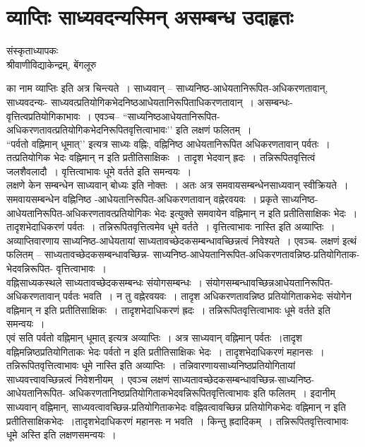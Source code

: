 {\fontsize{15}{17}\selectfont
\presetvalues
\chapter{व्याप्तिः साध्यवदन्यस्मिन्  असम्बन्ध उदाहृतः}

\begin{center}
\smallskip

संस्कृताध्यापकः\\
श्रीवाणीविद्याकेन्द्रम्, बेंगलूरु
\addrule
\end{center}

का नाम व्याप्तिः इति अत्र चिन्त्यते~। साध्यवान् – साध्यनिष्ठ-आधेयतानिरू\break पित-अधिकरणतावान्, साध्यवदन्यः- साध्यवत्प्रतियोगिकभेदनिष्ठ\enginline{-}आधेयतानिरूपि\break ताधिकरणतावान्~। असम्बन्धः-वृत्तित्वप्रतियोगिकाभावः~। एवञ्च– “साध्यनिष्ठ\enginline{-}आधेयता\break निरूपित-अधिकरणतावत्प्रतियोगिकभेदनिरूपितवृत्तित्वाभावः’’ इति लक्षणं फलितम्~। 
~\\[0.2cm]
“पर्वतो वह्निमान् धूमात्’’ इत्यत्र साध्यः वह्निः, वह्निनिष्ठ आधेयतानिरूपित अधिकरणतावान् पर्वतः~। तत्प्रतियोगिक भेदः वह्निमान् न इति प्रतीतिसाक्षिकः~। तादृश भेदवान् ह्रदः~। तन्निरूपितवृत्तित्वं जलशैवलादौ~। वृत्तित्वाभावः धूमे वर्तते इति समन्वयः~। 
~\\[0.2cm]
लक्षणे केन सम्बन्धेन साध्यवान् बोध्यः इति नोक्तः~। अतः अत्र समवायसम्बन्धेन\break साध्यवान् स्वीक्रियते~। समवायसम्बन्धेन वह्निनिष्ठ -आधेयता\-निरूपित-अधिकरणतावान् वह्नेरवयवः~। प्रकृते साध्यनिष्ठ-आधेयतानिरूपित-अधिकरणतावत्प्रतियोगिकः भेदः इत्युक्ते \hbox{समवायेन} वह्निमान् न इति प्रतीतिसाक्षिकः भेदः~। तादृशभेदाधिकरणं पर्वतः~। तन्निरूपितवृत्तित्वमेव धूमे वर्तते~। वृत्तित्वाभावः नास्ति इति अव्याप्तिः~। अव्याप्तिवारणाय साध्यनिष्ठ-आधेयतायां साध्यतावच्छेदकसम्बन्धावच्छिन्नत्वं निवेश्यते~। एवञ्च- लक्षणं इत्थं फलितम् – साध्यतावच्छेदकसम्बन्धावच्छिन्न- साध्यनिष्ठ-आधेयतानिरूपित-अधिकरणतावन्निष्ठ-प्रतियोगिताक-भेदवन्नि\-रूपित- वृत्तित्वाभावः~। 
~\\[0.2cm]
वह्निसाध्यकस्थले साध्यतावच्छेदकसम्बन्धः संयोगसम्बन्धः~। संयोगसम्बन्धावच्छिन्न\break आधेयतानिरूपित-अधिकरणतावान् पर्वतः भवति~। न तु वह्नेरवयवः~। तादृश अधिकरणतावन्निष्ठ प्रतियोगिताकभेदः संयोगेन वह्निमान् न इति प्रतीतिसाक्षिकः~। तादृशभेदाधिकरणं ह्रदः~। तन्निरूपितवृत्तित्वाभावः धूमे वर्तते इति समन्वयः~। 
~\\[0.2cm]
एवं सति पर्वतो वह्निमान् धूमात् इत्यत्र अव्याप्तिः~। अत्र साध्यवान् वह्निमान् पर्वतः~।\break तादृश वह्निमन्निष्ठप्रतियोगिताकः भेदः पर्वतो न इति प्रतीतिसाक्षिकः भेदः~। तादृशभेदा\-धिकरणं महानसः~। तन्निरूपितवृत्तित्वाभावः धूमे नास्ति इति अव्याप्तिः~। तन्निवारणाय\break साध्यनिष्ठप्रतियोगितायां साध्यवत्त्वावच्छिन्नत्वं निवेशनीयम्~। एवञ्च लक्षणं साध्यतावच्छेद\-कसम्बन्धावच्छिन्न-साध्यनिष्ठ-आधेयतानिरूपित- अधिकरणतानिष्ठप्रतियोगिताकभेदवन्निरूपितवृत्तित्वाभावः इति फलितम्~। इदानीम् साध्यवान् वह्निमान्, साध्यवत्वावच्छिन्न-प्रति\-योगिताकभेदः वह्निवत्वावच्छिन्न प्रतियोगिकभेदः वह्निमान् न इति प्रतीतिसाक्षिकभेदः~।\break तादृशभेदाधिकरणं महानसः न भवति~। किन्तु ह्रदादिकम्~। तन्निरूपितवृत्तित्वाभावः धूमे अस्ति इति लक्षणसमन्वयः~। 

\articleend
}
